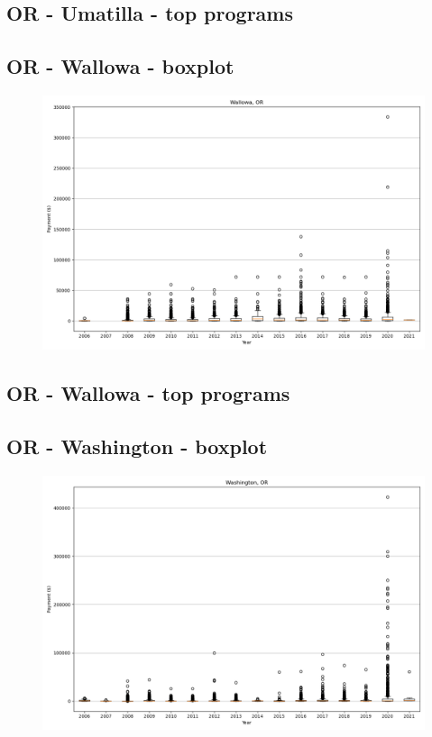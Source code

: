 \subsection*{OR - Umatilla - top programs}

\newpage
\subsection*{OR - Wallowa - boxplot}
\begin{figure}[h]
\centering
\includegraphics[width=7in]{../output/boxplots/counties/Wallowa-OR_boxplot.png}
\end{figure}


\subsection*{OR - Wallowa - top programs}

\newpage
\subsection*{OR - Washington - boxplot}
\begin{figure}[h]
\centering
\includegraphics[width=7in]{../output/boxplots/counties/Washington-OR_boxplot.png}
\end{figure}


